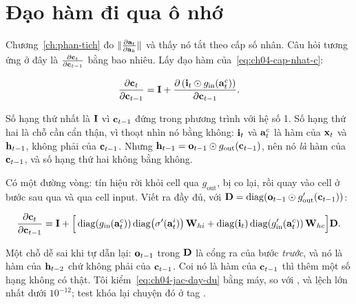 \section{Đạo hàm đi qua ô nhớ}
\label{sec:ch04-dao-ham}

%
Chương~\ref{ch:phan-tich} đo \(\lVert \frac{\partial \mathbf{a}_t}{\partial \mathbf{a}_k} \rVert\) và thấy
nó tắt theo cấp số nhân. Câu hỏi tương ứng ở đây là
\(\frac{\partial \mathbf{c}_t}{\partial \mathbf{c}_{t-1}}\) bằng bao nhiêu. Lấy đạo hàm
của~\eqref{eq:ch04-cap-nhat-c}:

\begin{equation}
  \frac{\partial \mathbf{c}_t}{\partial \mathbf{c}_{t-1}}
    = \mathbf{I}
    + \frac{\partial \left(\mathbf{i}_t \odot g_{\mathrm{in}}(\mathbf{a}^{c}_t)\right)}{\partial \mathbf{c}_{t-1}}.
  \label{eq:ch04-jac-tach}
\end{equation}

Số hạng thứ nhất là \(\mathbf{I}\) vì \(\mathbf{c}_{t-1}\) đứng trong phương trình
với hệ số 1. Số hạng thứ hai là chỗ cần cẩn thận, vì thoạt nhìn nó bằng không:
\(\mathbf{i}_t\) và \(\mathbf{a}^{c}_t\) là hàm của \(\mathbf{x}_t\) và
\(\mathbf{h}_{t-1}\), không phải của \(\mathbf{c}_{t-1}\). Nhưng
\(\mathbf{h}_{t-1} = \mathbf{o}_{t-1} \odot g_{\mathrm{out}}(\mathbf{c}_{t-1})\), nên
nó \emph{là} hàm của \(\mathbf{c}_{t-1}\), và số hạng thứ hai không bằng không.

Có một đường vòng: tín hiệu rời khỏi cell qua \(g_{\mathrm{out}}\), bị
 co lại, rồi quay vào cell ở bước sau qua
 và qua cell input. Viết ra đầy đủ, với
\(\mathbf{D} = \operatorname{diag}(\mathbf{o}_{t-1} \odot g_{\mathrm{out}}'(\mathbf{c}_{t-1}))\):

\begin{equation}
  \frac{\partial \mathbf{c}_t}{\partial \mathbf{c}_{t-1}}
    = \mathbf{I}
    + \Big[
        \operatorname{diag}\!\left(g_{\mathrm{in}}(\mathbf{a}^{c}_t)\right)
        \operatorname{diag}\!\left(\sigma'(\mathbf{a}^{i}_t)\right) \mathbf{W}_{hi}
      + \operatorname{diag}(\mathbf{i}_t)
        \operatorname{diag}\!\left(g_{\mathrm{in}}'(\mathbf{a}^{c}_t)\right) \mathbf{W}_{hc}
      \Big] \mathbf{D}.
  \label{eq:ch04-jac-day-du}
\end{equation}

Một chỗ dễ sai khi tự dẫn lại: \(\mathbf{o}_{t-1}\) trong \(\mathbf{D}\) là cổng ra
của bước \emph{trước}, và nó là hàm của \(\mathbf{h}_{t-2}\) chứ không phải của
\(\mathbf{c}_{t-1}\). Coi nó là hàm của \(\mathbf{c}_{t-1}\) thì
thêm một số hạng không có thật. Tôi kiểm~\eqref{eq:ch04-jac-day-du} bằng máy,
so với , và lệch lớn nhất dưới
\(10^{-12}\); test khóa lại chuyện đó ở tag .

